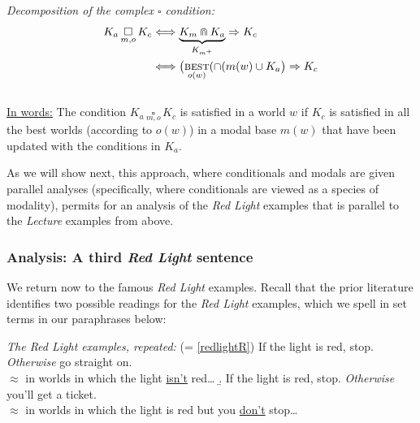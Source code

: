 %

\pex \label{decomp} \textit{Decomposition of the complex $ \square $ condition:} 
\begin{align*} K_a\,\underset{m,o}{\square}\,K_c
	&\Longleftrightarrow \underbrace{K_m\Cap K_a}_{K_{m^+}}\Rightarrow K_c\\
	&\Longleftrightarrow \big(\underset{o(w)}{\textsc{best}}(\cap(m(w)\cup K_a\big)\Rightarrow K_c
\end{align*}\\
\underline{In words:} The condition $K_a\,\underset{m,o}{\square}\,K_c$ is satisfied in a world $ w $ if $ K_c $ is satisfied in all the best worlds (according to $ o(w) $) in a modal base $ m(w) $ that have been updated with the conditions in $ K_a $.\xe

As we will show next, this approach, where conditionals and modals are given parallel analyses (specifically, where conditionals are viewed as a species of modality), permits for an analysis of the \textit{Red Light} examples that is parallel to the \textit{Lecture} examples from above. 


\subsubsection{Analysis: A third \textit{Red Light} sentence}
\label{sec:con}

We return now to the famous \textit{Red Light} examples. Recall that the prior literature identifies two possible readings for the \textit{Red Light} examples, which we spell in set terms in our paraphrases below:  

\pex \label{redlightR-rpt} \textit{The Red Light examples, repeated:} \hfill (= \ref{redlightR})
\a  \label{redlighta-rpt0}If the light is red, stop. \textit{Otherwise} go straight on.\\\color{violet}\phantom{If the light} $\approx$ in worlds in which the light \ul{isn't} red\ldots \vspace{.5\baselineskip}
\color{black}\b. \label{redlightb-rpt0}If the light is red, stop. \textit{Otherwise} you'll get a ticket.\\\color{violet}\phantom{If the light} $\approx$ in worlds in which the light is red but you \ul{don't} stop\ldots\xe


